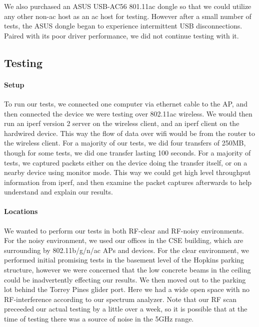 We also purchased an ASUS USB-AC56 801.11ac dongle so that we could
utilize any other non-ac host as an ac host for testing. However after
a small number of tests, the ASUS dongle began to experience
intermittent USB disconnections. Paired with its poor driver
performance, we did not continue testing with it.

\subsection{Testing}

\paragraph{Setup}
To run our tests, we connected one computer via ethernet cable to the AP, and
then connected the device we were testing over 802.11ac wireless. We would then
run an iperf version 2  server on the wireless client, and
an iperf client on the hardwired device. This way the flow of data over wifi
would be from the router to the wireless client. For a majority of our tests, we
did four transfers of 250MB, though for some tests, we did one transfer lasting
100 seconds. For a majority of tests, we captured packets either on the device
doing the transfer itself, or on a nearby device using monitor mode. This way
we could get high level throughput information from iperf, and then examine the
packet captures afterwards to help understand and explain our results.

\paragraph{Locations}
We wanted to perform our tests in both RF-clear and RF-noisy
environments. For the noisy environment, we used our offices in the
CSE building, which are surrounding by 802.11b/g/n/ac APs and
devices. For the clear environment, we performed initial promising
tests in the basement level of the Hopkins parking structure, however
we were concerned that the low concrete beams in the ceiling could be
inadvertently effecting our results. We then moved out to the parking
lot behind the Torrey Pines glider port. Here we had a wide open space
with no RF-interference according to our spectrum analyzer. Note that
our RF scan preceeded our actual testing by a little over a week, so
it is possible that at the time of testing there was a source of noise
in the 5GHz range.


